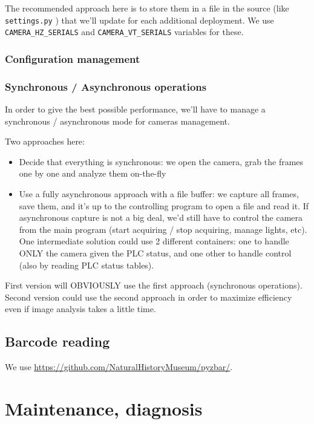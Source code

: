 The recommended approach here is to store them in a file in the source (like \texttt{settings.py} ) that we'll update for each additional deployment. We use \texttt{CAMERA\_HZ\_SERIALS} and \texttt{CAMERA\_VT\_SERIALS} variables for these.

\subsubsection{Configuration management}


\subsubsection{Synchronous / Asynchronous operations}

In order to give the best possible performance, we'll have to manage a synchronous / asynchronous mode
for cameras management.

Two approaches here:

\begin{itemize}
    \item Decide that everything is synchronous: we open the camera, grab the frames one by one
        and analyze them on-the-fly
    \item Use a fully asynchronous approach with a file buffer: we capture all frames, save them,
        and it's up to the controlling program to open a file and read it.
        If asynchronous capture is not a big deal, we'd still have to control the camera from the
        main program (start acquiring / stop acquiring, manage lights, etc).
        One intermediate solution could use 2 different containers: one to handle ONLY the camera
        given the PLC status, and one other to handle control (also by reading PLC status tables).
\end{itemize}

First version will OBVIOUSLY use the first approach (synchronous operations). Second version
could use the second approach in order to maximize efficiency even if image analysis takes
a little time.

\subsection{Barcode reading}

We use \url{https://github.com/NaturalHistoryMuseum/pyzbar/}.


\section{Maintenance, diagnosis}

